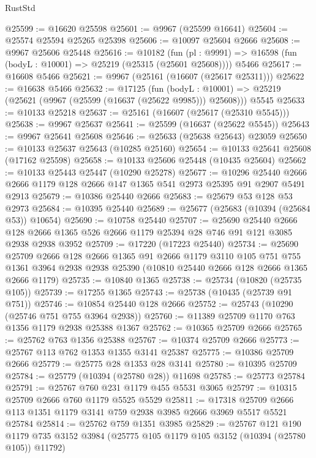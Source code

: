 \begin{lexlean}{RustStd}
\begin{coremodule}
@25599 := @16620 @25598
@25601 := @9967 (@25599 @16641)
@25604 := @25574 @25594 @25265 @25398
@25606 := @10097 @25604 @2666
@25608 := @9967 @25606 @25448
@25616 := @10182
    (fun (pl : @9991) => @16598 (fun (bodyL : @10001) => @25219 (@25315 (@25601 @25608))))
    @5466
@25617 := @16608 @5466
@25621 := @9967 (@25161 (@16607 (@25617 @25311)))
@25622 := @16638 @5466
@25632 := @17125
    (fun (bodyL : @10001) => @25219 (@25621 (@9967 (@25599 (@16637 (@25622 @9985))) @25608)))
    @5545
@25633 := @10133 @25218
@25637 := @25161 (@16607 (@25617 (@25310 @5545)))
@25638 := @9967 @25637
@25641 := @25599 (@16637 (@25622 @5545))
@25643 := @9967 @25641 @25608
@25646 := @25633 (@25638 @25643) @23059
@25650 := @10133 @25637 @25643 (@10285 @25160)
@25654 := @10133 @25641 @25608 (@17162 @25598)
@25658 := @10133 @25606 @25448 (@10435 @25604)
@25662 := @10133 @25443 @25447 (@10290 @25278)
@25677 := @10296
    @25440
    @2666
    @2666
    @1179
    @128
    @2666
    @147
    @1365
    @541
    @2973
    @25395
    @91
    @2907
    @5491
    @2913
@25679 := @10386 @25440 @2666
@25683 := @25679 @53 @128 @53 @2973
@25684 := @10395 @25440
@25689 := @25677 (@25683 (@10394 (@25684 @53)) @10654)
@25690 := @10758 @25440
@25707 := @25690
    @25440
    @2666
    @128
    @2666
    @1365
    @526
    @2666
    @1179
    @25394
    @28
    @746
    @91
    @121
    @3085
    @2938
    @2938
    @3952
@25709 := @17220 (@17223 @25440)
@25734 := @25690
    @25709
    @2666
    @128
    @2666
    @1365
    @91
    @2666
    @1179
    @3110
    @105
    @751
    @755
    @1361
    @3964
    @2938
    @2938
    @25390
    (@10810 @25440 @2666 @128 @2666 @1365 @2666 @1179)
@25735 := @10840 @1365
@25738 := @25734 (@10820 (@25735 @105))
@25739 := @17255 @1365
@25743 := @25738 (@10435 (@25739 @91 @751))
@25746 := @10854 @25440 @128 @2666
@25752 := @25743 (@10290 (@25746 @751 @755 @3964 @2938))
@25760 := @11389 @25709 @1170 @763 @1356 @1179 @2938 @25388 @1367
@25762 := @10365 @25709 @2666
@25765 := @25762 @763 @1356 @25388
@25767 := @10374 @25709 @2666
@25773 := @25767 @113 @762 @1353 @1355 @3141 @25387
@25775 := @10386 @25709 @2666
@25779 := @25775 @28 @1353 @28 @3141
@25780 := @10395 @25709
@25784 := @25779 (@10394 (@25780 @28)) @11698
@25785 := @25773 @25784
@25791 := @25767 @760 @231 @1179 @455 @5531 @3065
@25797 := @10315 @25709 @2666 @760 @1179 @5525 @5529
@25811 := @17318 @25709 @2666 @113 @1351 @1179 @3141 @759 @2938 @3985 @2666 @3969 @5517 @5521 @25784
@25814 := @25762 @759 @1351 @3985
@25829 := @25767
    @121
    @190
    @1179
    @735
    @3152
    @3984
    (@25775 @105 @1179 @105 @3152 (@10394 (@25780 @105)) @11792)

\end{coremodule}
\end{lexlean}
